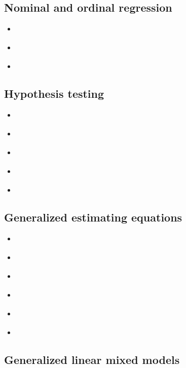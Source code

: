 \documentclass{report}
\begin{document}
\subsection{Nominal and ordinal regression}

\begin{itemize}
    \item \cite[Chapter~8]{dobson_introduction_2018}
    \item \cite[Chapter~6]{agresti_foundations_2015}
    \item \cite[Chapters~15-16]{hardin_generalized_2018}
\end{itemize}

\subsection{Hypothesis testing}

\begin{itemize}
    \item \cite[Chapter~8.4]{faraway_extending_2016}
    \item \cite[Chapter~6.5.3]{wakefield_bayesian_2013}
    \item \cite[Chapter~5.7]{dobson_introduction_2018}
    \item \cite[Chapter~4.3]{agresti_foundations_2015}
    \item \cite[Chapter~7]{dunn_generalized_2018}
\end{itemize}

\subsection{Generalized estimating equations}

\begin{itemize}
    \item \cite[Chapter~13.5]{faraway_extending_2016}
    \item \cite[Chapter~8.7]{wakefield_bayesian_2013}
    \item \cite[Chapter~11.4]{dobson_introduction_2018}
    \item \cite[Chapter~9.6]{agresti_foundations_2015}
    \item \cite[Chapter~18.6]{hardin_generalized_2018}
    \item \cite[Chapters~3-4]{hardin_generalized_2012}
\end{itemize}

\subsection{Generalized linear mixed models}
\end{document}
